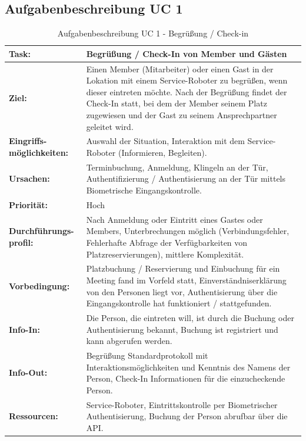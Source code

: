 \documentclass[
  ngerman           %
  ,twoside          %
  ,11pt
  ,pdftex
]{report}
\begin{document}
\subsection*{Aufgabenbeschreibung UC 1}
\begin{table}[hbt!]
    \begin{center}
        \begin{tabular}{| p{3cm} | p{12.75cm} | }
            \hline
                \textbf{Task:} & \textbf{Begrüßung / Check-In von Member und Gästen} \\
            \hline
                \textbf{Ziel:} & Einen Member (Mitarbeiter) oder einen Gast in der Lokation mit einem Service-Roboter zu begrüßen, wenn dieser eintreten möchte. Nach der Begrüßung findet der Check-In statt, bei dem der Member seinem Platz zugewiesen und der Gast zu seinem Ansprechpartner geleitet wird. \\
            \hline
                \textbf{Eingriffs-möglichkeiten:} & Auswahl der Situation, Interaktion mit dem Service-Roboter (Informieren, Begleiten). \\
            \hline
                \textbf{Ursachen:} & Terminbuchung, Anmeldung, Klingeln an der Tür, Authentifizierung / Authentisierung an der Tür mittels Biometrische Eingangskontrolle. \\
            \hline
                \textbf{Priorität:} & Hoch \\
            \hline
                \textbf{Durchführungs-profil:} & Nach Anmeldung oder Eintritt eines Gastes oder Members, Unterbrechungen möglich (Verbindungsfehler, Fehlerhafte Abfrage der Verfügbarkeiten von Platzreservierungen), mittlere Komplexität. \\ 
            \hline
                \textbf{Vorbedingung:} & Platzbuchung / Reservierung und Einbuchung für ein Meeting fand im Vorfeld statt, Einverständniserklärung von den Personen liegt vor, Authentisierung über die Eingangskontrolle hat funktioniert / stattgefunden. \\
            \hline 
                \textbf{Info-In:} & Die Person, die eintreten will, ist durch die Buchung oder Authentisierung bekannt, Buchung ist registriert und kann abgerufen werden. \\
            \hline
                \textbf{Info-Out:} & Begrüßung Standardprotokoll mit Interaktionsmöglichkeiten und Kenntnis des Namens der Person, Check-In Informationen für die einzucheckende Person. \\
            \hline
                \textbf{Ressourcen:} & Service-Roboter, Eintrittskontrolle per Biometrischer Authentisierung, Buchung der Person abrufbar über die API. \\
            \hline
        \end{tabular}
    \end{center}
    \caption{Aufgabenbeschreibung UC 1 - Begrüßung / Check-in}
    \label{tab:checkIn}
\end{table}
\end{document}
